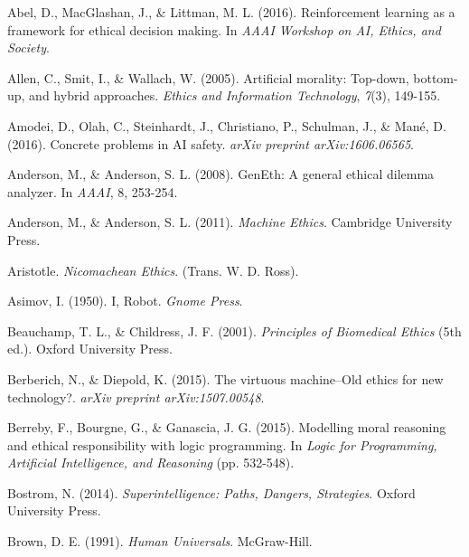 \documentclass[12pt]{article}
\begin{document}

\begin{thebibliography}{99}

Abel, D., MacGlashan, J., \& Littman, M. L. (2016). Reinforcement learning as a framework for ethical decision making. In \textit{AAAI Workshop on AI, Ethics, and Society}.

Allen, C., Smit, I., \& Wallach, W. (2005). Artificial morality: Top-down, bottom-up, and hybrid approaches. \textit{Ethics and Information Technology}, \textit{7}(3), 149-155.

Amodei, D., Olah, C., Steinhardt, J., Christiano, P., Schulman, J., \& Mané, D. (2016). Concrete problems in AI safety. \textit{arXiv preprint arXiv:1606.06565}.

Anderson, M., \& Anderson, S. L. (2008). GenEth: A general ethical dilemma analyzer. In \textit{AAAI}, 8, 253-254.

Anderson, M., \& Anderson, S. L. (2011). \textit{Machine Ethics}. Cambridge University Press.

Aristotle. \textit{Nicomachean Ethics}. (Trans. W. D. Ross).

Asimov, I. (1950). I, Robot. \textit{Gnome Press}.

Beauchamp, T. L., \& Childress, J. F. (2001). \textit{Principles of Biomedical Ethics} (5th ed.). Oxford University Press.

Berberich, N., \& Diepold, K. (2015). The virtuous machine–Old ethics for new technology?. \textit{arXiv preprint arXiv:1507.00548}.

Berreby, F., Bourgne, G., \& Ganascia, J. G. (2015). Modelling moral reasoning and ethical responsibility with logic programming. In \textit{Logic for Programming, Artificial Intelligence, and Reasoning} (pp. 532-548).

Bostrom, N. (2014). \textit{Superintelligence: Paths, Dangers, Strategies}. Oxford University Press.

Brown, D. E. (1991). \textit{Human Universals}. McGraw-Hill.


\end{thebibliography}
\end{document}
